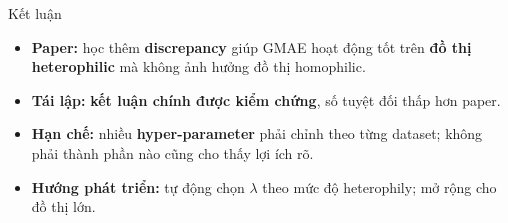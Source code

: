 \begin{frame}{Kết luận}
  \begin{itemize}
    \setlength{\itemsep}{0.8em}
    \item \textbf{Paper:} học thêm \textbf{discrepancy} giúp GMAE hoạt động tốt trên \textbf{đồ thị heterophilic}
      mà không ảnh hưởng đồ thị homophilic.
    \item \textbf{Tái lập:} \textbf{kết luận chính được kiểm chứng}, số tuyệt đối thấp hơn paper.
    \item \textbf{Hạn chế:} nhiều \textbf{hyper-parameter} phải chỉnh theo từng dataset; không phải thành phần nào cũng cho thấy lợi ích rõ.
    \item \textbf{Hướng phát triển:} tự động chọn $\lambda$ theo mức độ heterophily; mở rộng cho đồ thị lớn.
  \end{itemize}
\end{frame}

